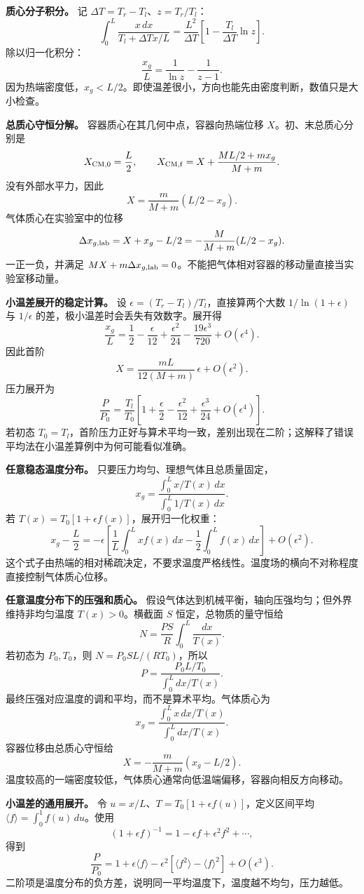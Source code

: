 \documentclass[12pt,a4paper,UTF8]{ctexart}
\begin{document}
\textbf{质心分子积分。} 记 \(\Delta T=T_r-T_l\)、\(z=T_r/T_l\)： \[
\int_0^L\frac{x\,dx}{T_l+\Delta T x/L}
=\frac{L^2}{\Delta T}
\left[1-\frac{T_l}{\Delta T}\ln z\right].
\] 除以归一化积分： \[
\frac{x_g}{L}=\frac1{\ln z}-\frac1{z-1}.
\]
因为热端密度低，\(x_g<L/2\)。即使温差很小，方向也能先由密度判断，数值只是大小检查。

\textbf{总质心守恒分解。} 容器质心在其几何中点，容器向热端位移
\(X\)。初、末总质心分别是 \[
X_{\rm CM,0}=\frac L2,\qquad
X_{\rm CM,f}=X+\frac{ML/2+mx_g}{M+m}.
\] 没有外部水平力，因此 \[
X=\frac{m}{M+m}(L/2-x_g).
\] 气体质心在实验室中的位移 \[
\Delta x_{g,\rm lab}=X+x_g-L/2
=-\frac{M}{M+m}(L/2-x_g).
\] 一正一负，并满足
\(MX+m\Delta x_{g,\rm lab}=0\)。不能把气体相对容器的移动量直接当实验室移动量。

\textbf{小温差展开的稳定计算。} 设
\(\epsilon=(T_r-T_l)/T_l\)，直接算两个大数 \(1/\ln(1+\epsilon)\) 与
\(1/\epsilon\) 的差，极小温差时会丢失有效数字。展开得 \[
\frac{x_g}{L}=\frac12-\frac{\epsilon}{12}
+\frac{\epsilon^2}{24}-\frac{19\epsilon^3}{720}+O(\epsilon^4).
\] 因此首阶 \[
X=\frac{mL}{12(M+m)}\,\epsilon+O(\epsilon^2).
\] 压力展开为 \[
\frac P{P_0}=\frac{T_l}{T_0}
\left[1+\frac\epsilon2-\frac{\epsilon^2}{12}
+\frac{\epsilon^3}{24}+O(\epsilon^4)\right].
\] 若初态
\(T_0=T_l\)，首阶压力正好与算术平均一致，差别出现在二阶；这解释了错误平均法在小温差算例中为何可能看似准确。

\textbf{任意稳态温度分布。} 只要压力均匀、理想气体且总质量固定， \[
x_g=\frac{\int_0^L x/T(x)\,dx}{\int_0^L1/T(x)\,dx}.
\] 若 \(T(x)=T_0[1+\epsilon f(x)]\)，展开归一化权重： \[
x_g-\frac L2=-\epsilon
\left[\frac1L\int_0^Lxf(x)\,dx
-\frac12\int_0^Lf(x)\,dx\right]+O(\epsilon^2).
\]
这个式子由热端的相对稀疏决定，不要求温度严格线性。温度场的横向不对称程度直接控制气体质心位移。

\textbf{任意温度分布下的压强和质心。}
假设气体达到机械平衡，轴向压强均匀；但外界维持非均匀温度
\(T(x)>0\)。横截面 \(S\) 恒定，总物质的量守恒给 \[
N=\frac{PS}{R}\int_0^L\frac{dx}{T(x)}.
\] 若初态为 \(P_0,T_0\)，则 \(N=P_0SL/(RT_0)\)，所以 \[
\boxed{P=\frac{P_0L/T_0}{\int_0^Ldx/T(x)}}.
\] 最终压强对应温度的调和平均，而不是算术平均。气体质心为 \[
\boxed{x_g=
\frac{\int_0^Lx\,dx/T(x)}
{\int_0^Ldx/T(x)}}.
\] 容器位移由总质心守恒给 \[
X=-\frac{m}{M+m}(x_g-L/2).
\]
温度较高的一端密度较低，气体质心通常向低温端偏移，容器向相反方向移动。

\textbf{小温差的通用展开。} 令
\(u=x/L\)、\(T=T_0[1+\epsilon f(u)]\)，定义区间平均
\(\langle f\rangle=\int_0^1f(u)\,du\)。使用 \[
(1+\epsilon f)^{-1}=1-\epsilon f+\epsilon^2f^2+\cdots,
\] 得到 \[
\boxed{\frac{P}{P_0}=1+\epsilon\langle f\rangle
-\epsilon^2[\langle f^2\rangle-\langle f\rangle^2]+O(\epsilon^3)}.
\]
二阶项是温度分布的负方差，说明同一平均温度下，温度越不均匀，压力越低。
\end{document}
